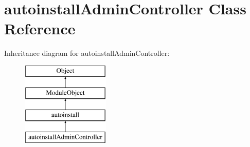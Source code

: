 \hypertarget{classautoinstallAdminController}{\section{autoinstall\-Admin\-Controller Class Reference}
\label{classautoinstallAdminController}
}
Inheritance diagram for autoinstall\-Admin\-Controller\-:\begin{figure}[H]
\begin{center}
\leavevmode
\includegraphics[height=4.000000cm]{classautoinstallAdminController}
\end{center}
\end{figure}
